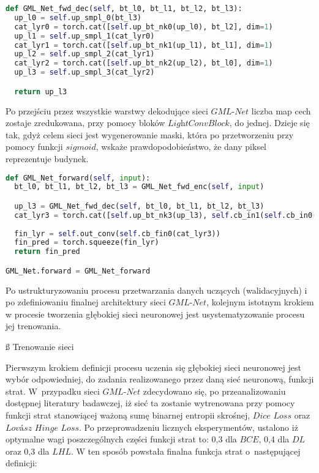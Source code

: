 \cell
\begin{lstlisting}[name=Rozdzial3.1, language=Python]
def GML_Net_fwd_dec(self, bt_l0, bt_l1, bt_l2, bt_l3):
  up_l0 = self.up_smpl_0(bt_l3)
  cat_lyr0 = torch.cat([self.up_bt_nk0(up_l0), bt_l2], dim=1)
  up_l1 = self.up_smpl_1(cat_lyr0)
  cat_lyr1 = torch.cat([self.up_bt_nk1(up_l1), bt_l1], dim=1)
  up_l2 = self.up_smpl_2(cat_lyr1)
  cat_lyr2 = torch.cat([self.up_bt_nk2(up_l2), bt_l0], dim=1)
  up_l3 = self.up_smpl_3(cat_lyr2)

  return up_l3
\end{lstlisting}
\vspace{0.5cm}

\cell
Po przejściu przez wszystkie warstwy dekodujące sieci $\textit{GML-Net}$ liczba map cech zostaje zredukowana, przy pomocy bloków $\textit{LightConvBlock}$, do jednej. Dzieje się tak, gdyż celem sieci jest wygenerowanie maski, która po przetworzeniu przy pomocy funkcji $\textit{sigmoid}$, wskaże prawdopodobieństwo, że dany piksel reprezentuje budynek. 

\cell
\begin{lstlisting}[name=Rozdzial3.1, language=Python]
def GML_Net_forward(self, input):
  bt_l0, bt_l1, bt_l2, bt_l3 = GML_Net_fwd_enc(self, input)

  up_l3 = GML_Net_fwd_dec(self, bt_l0, bt_l1, bt_l2, bt_l3)
  cat_lyr3 = torch.cat([self.up_bt_nk3(up_l3), self.cb_in1(self.cb_in0(input))], dim=1)
  
  fin_lyr = self.out_conv(self.cb_fin0(cat_lyr3))
  fin_pred = torch.squeeze(fin_lyr)
  return fin_pred

GML_Net.forward = GML_Net_forward
\end{lstlisting}


\cell
Po ustrukturyzowaniu procesu przetwarzania danych uczących (walidacyjnych) i po zdefiniowaniu finalnej architektury sieci $\textit{GML-Net}$, kolejnym istotnym krokiem w procesie tworzenia głębokiej sieci neuronowej jest usystematyzowanie procesu jej trenowania.  

\vspace{-0.5cm}
\cell
\ss{ Trenowanie sieci}

\cell
Pierwszym krokiem definicji procesu uczenia się głębokiej sieci neuronowej jest wybór odpowiedniej, do zadania realizowanego przez daną sieć neuronową, funkcji strat. W~przypadku sieci $\textit{GML-Net}$ zdecydowano się, po przeanalizowaniu dostępnej literatury badawczej, iż sieć ta zostanie wytrenowana przy pomocy funkcji strat stanowiącej ważoną sumę binarnej entropii skrośnej, $\textit{Dice Loss}$ oraz $\textit{Lovász Hinge Loss}$. Po przeprowadzeniu licznych eksperymentów, ustalono iż optymalne wagi poszczególnych części funkcji strat to: 0,3 dla $\textit{BCE}$, 0,4 dla $\textit{DL}$ oraz 0,3 dla $\textit{LHL}$. W ten sposób powstała finalna funkcja strat o~następującej definicji: 
\vspace{-1cm}

